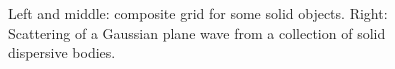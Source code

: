 {\begin{figure}[htb]
\begin{center}
{\begin{tikzpicture}[scale=1]
% 
\end{tikzpicture}
}%
\end{center}
\caption{
  Left and middle: composite grid for some solid objects. 
  Right: Scattering of a Gaussian plane wave from a collection of solid dispersive bodies.
}
  \label{fig:solidObjects}
\end{figure}
}


